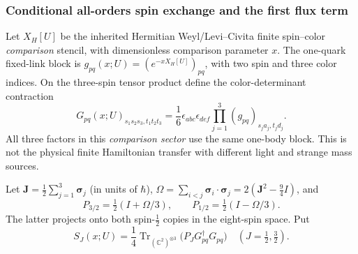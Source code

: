 \documentclass[12pt,a4paper]{article}
\begin{document}
\subsubsection{Conditional all-orders spin exchange and the first flux term}
\label{p10:subsec:v2220-spin-exchange}
Let $X_H[U]$ be the inherited Hermitian Weyl/Levi--Civita finite
spin--color \emph{comparison} stencil, with dimensionless comparison
parameter $x$.  The one-quark fixed-link block is
$g_{pq}(x;U)=(e^{-xX_H[U]})_{pq}$, with two spin and three color indices.
On the three-spin tensor product define the color-determinant contraction
\begin{equation}
\label{p10:eq:v2220-singlet-transfer}
 G_{pq}(x;U)_{s_1s_2s_3,t_1t_2t_3}
 =\frac16\epsilon_{abc}\epsilon_{def}
 \prod_{j=1}^{3}(g_{pq})_{s_ja_j,t_jd_j}.
\end{equation}
All three factors in this \emph{comparison sector} use the same
one-body block.  This is not the physical finite Hamiltonian transfer
with different light and strange mass sources.

Let $\mathbf J=\tfrac12\sum_{j=1}^3\boldsymbol\sigma_j$ (in units of
$\hbar$),
$\Omega=\sum_{i<j}\boldsymbol\sigma_i\cdot\boldsymbol\sigma_j
=2(\mathbf J^2-\tfrac94I)$, and
\[
 P_{3/2}=\tfrac12(I+\Omega/3),\qquad
 P_{1/2}=\tfrac12(I-\Omega/3).
\]
The latter projects onto both spin-$\tfrac12$ copies in the eight-spin
space.  Put
\[
 S_J(x;U)=\frac1{4}\operatorname{Tr}_{(\mathbb C^2)^{\otimes3}}
   \bigl(P_JG_{pq}^{\dagger}G_{pq}\bigr)
 \quad(J=\tfrac12,\tfrac32).
\]
\end{document}
